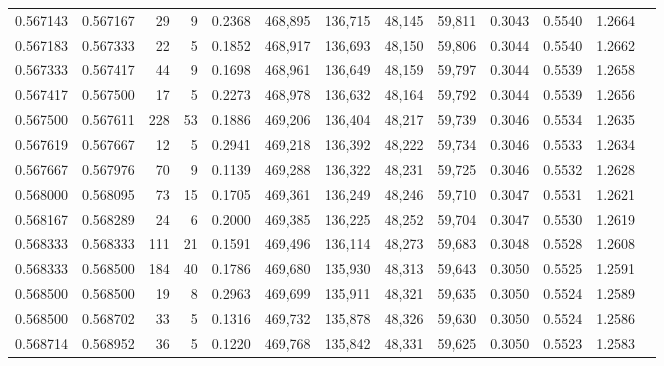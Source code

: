 \begin{tabular}{rrrrrrrrrrrrr}
0.567143 & 0.567167 &    29 &   9 &                                     0.2368 & 468,895 & 136,715 &  48,145 &  59,811 & 0.3043 & 0.5540 & 1.2664 \\
0.567183 & 0.567333 &    22 &   5 &                                     0.1852 & 468,917 & 136,693 &  48,150 &  59,806 & 0.3044 & 0.5540 & 1.2662 \\
0.567333 & 0.567417 &    44 &   9 &                                     0.1698 & 468,961 & 136,649 &  48,159 &  59,797 & 0.3044 & 0.5539 & 1.2658 \\
0.567417 & 0.567500 &    17 &   5 &                                     0.2273 & 468,978 & 136,632 &  48,164 &  59,792 & 0.3044 & 0.5539 & 1.2656 \\
0.567500 & 0.567611 &   228 &  53 &                                     0.1886 & 469,206 & 136,404 &  48,217 &  59,739 & 0.3046 & 0.5534 & 1.2635 \\
0.567619 & 0.567667 &    12 &   5 &                                     0.2941 & 469,218 & 136,392 &  48,222 &  59,734 & 0.3046 & 0.5533 & 1.2634 \\
0.567667 & 0.567976 &    70 &   9 &                                     0.1139 & 469,288 & 136,322 &  48,231 &  59,725 & 0.3046 & 0.5532 & 1.2628 \\
0.568000 & 0.568095 &    73 &  15 &                                     0.1705 & 469,361 & 136,249 &  48,246 &  59,710 & 0.3047 & 0.5531 & 1.2621 \\
0.568167 & 0.568289 &    24 &   6 &                                     0.2000 & 469,385 & 136,225 &  48,252 &  59,704 & 0.3047 & 0.5530 & 1.2619 \\
0.568333 & 0.568333 &   111 &  21 &                                     0.1591 & 469,496 & 136,114 &  48,273 &  59,683 & 0.3048 & 0.5528 & 1.2608 \\
0.568333 & 0.568500 &   184 &  40 &                                     0.1786 & 469,680 & 135,930 &  48,313 &  59,643 & 0.3050 & 0.5525 & 1.2591 \\
0.568500 & 0.568500 &    19 &   8 &                                     0.2963 & 469,699 & 135,911 &  48,321 &  59,635 & 0.3050 & 0.5524 & 1.2589 \\
0.568500 & 0.568702 &    33 &   5 &                                     0.1316 & 469,732 & 135,878 &  48,326 &  59,630 & 0.3050 & 0.5524 & 1.2586 \\
0.568714 & 0.568952 &    36 &   5 &                                     0.1220 & 469,768 & 135,842 &  48,331 &  59,625 & 0.3050 & 0.5523 & 1.2583 \\

\end{tabular}
